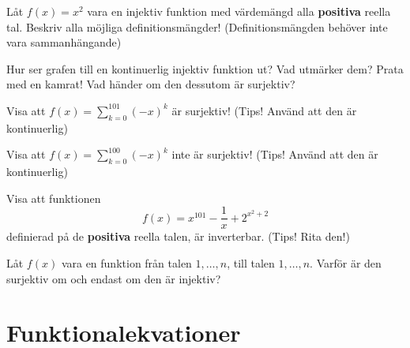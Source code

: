 \begin{problem}
	Låt \(f(x) = x^2\) vara en injektiv funktion med värdemängd alla \textbf{positiva} reella tal. Beskriv alla möjliga definitionsmängder! (Definitionsmängden behöver inte vara sammanhängande)
\end{problem}

\begin{problem}
	Hur ser grafen till en kontinuerlig injektiv funktion ut? Vad utmärker dem? Prata med en kamrat! Vad händer om den dessutom är surjektiv?
\end{problem}

\begin{problem}
	Visa att \(f(x) = \sum_{k=0} ^{101} (-x)^k\) är surjektiv! (Tips! Använd att den är kontinuerlig)
\end{problem}

\begin{problem}
	Visa att \(f(x) = \sum_{k=0} ^{100} (-x)^k\) inte är surjektiv! (Tips! Använd att den är kontinuerlig)
\end{problem}

\begin{problem}
	Visa att funktionen
	\[
		f(x) = x^{101} - \frac{1}{x} + 2^{x^2 + 2}
	\]
	definierad på de \textbf{positiva} reella talen, är inverterbar. (Tips! Rita den!)
\end{problem}

\begin{problem}
	Låt \(f(x)\) vara en funktion från talen \(1,\dots, n\), till talen \(1, \dots ,n\). Varför är den surjektiv om och endast om den är injektiv?
\end{problem}









\section{Funktionalekvationer}

